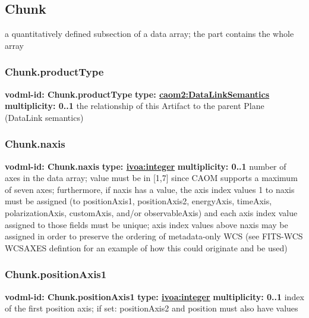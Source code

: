  \subsection{Chunk}
  \label{sect:Chunk}
    a quantitatively defined subsection of a data array; the part contains the whole array

    \subsubsection{Chunk.productType}
      \textbf{vodml-id: Chunk.productType} \newline
      \textbf{type: \hyperref[sect:DataLinkSemantics]{caom2:DataLinkSemantics}} \newline
      \textbf{multiplicity: 0..1} \newline
      the relationship of this Artifact to the parent Plane (DataLink semantics)

    \subsubsection{Chunk.naxis}
      \textbf{vodml-id: Chunk.naxis} \newline
      \textbf{type: \hyperref[sect:ivoa]{ivoa:integer}} \newline
      \textbf{multiplicity: 0..1} \newline
      number of axes in the data array; value must be in [1,7] since CAOM supports a maximum of seven axes; furthermore, if naxis has a value, the axis index values 1 to {naxis} must be assigned (to positionAxis1, positionAxis2, energyAxis, timeAxis, polarizationAxis, customAxis, and/or observableAxis) and each axis index value assigned to those fields must be unique; axis index values above {naxis} may be assigned in order to preserve the ordering of metadata-only WCS (see FITS-WCS WCSAXES defintion for an example of how this could originate and be used)

    \subsubsection{Chunk.positionAxis1}
      \textbf{vodml-id: Chunk.positionAxis1} \newline
      \textbf{type: \hyperref[sect:ivoa]{ivoa:integer}} \newline
      \textbf{multiplicity: 0..1} \newline
      index of the first position axis; if set: positionAxis2 and position must also have values


